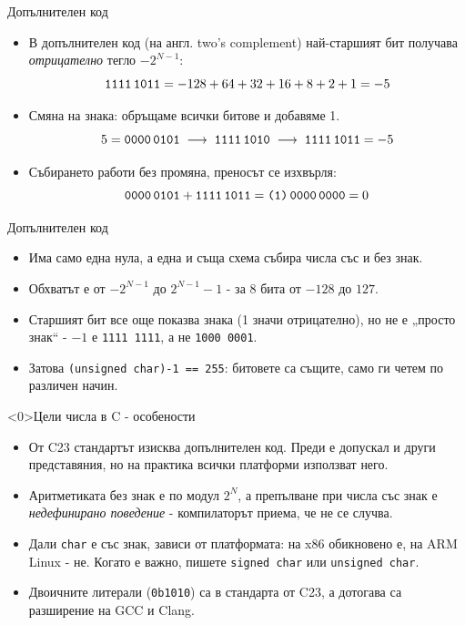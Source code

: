 \documentclass[14pt, aspectratio=169]{beamer}
\begin{document}
\begin{frame}{Допълнителен код}
  \begin{itemize}
    \item В допълнителен код (на англ. two's complement) най-старшият бит
      получава \emph{отрицателно} тегло $-2^{N-1}$:
      \[
        \texttt{1111\,1011} = -128 + 64 + 32 + 16 + 8 + 2 + 1 = -5
      \]
    \item Смяна на знака: обръщаме всички битове и добавяме 1.
      \[
        5 = \texttt{0000\,0101} \;\longrightarrow\; \texttt{1111\,1010}
        \;\longrightarrow\; \texttt{1111\,1011} = -5
      \]
    \item Събирането работи без промяна, преносът се изхвърля:
      \[
        \texttt{0000\,0101} + \texttt{1111\,1011} = \texttt{(1)\,0000\,0000} = 0
      \]
  \end{itemize}
\end{frame}

\begin{frame}{Допълнителен код}
  \begin{itemize}
    \item Има само една нула, а една и съща схема събира числа със и без знак.
    \item Обхватът е от $-2^{N-1}$ до $2^{N-1} - 1$ - за 8 бита от $-128$ до
      $127$.
    \item Старшият бит все още показва знака (1 значи отрицателно), но не е
      „просто знак“ - $-1$ е \texttt{1111\,1111}, а не \texttt{1000\,0001}.
    \item Затова \texttt{(unsigned char)-1 == 255}: битовете са същите, само
      ги четем по различен начин.
  \end{itemize}
\end{frame}

\begin{frame}<0>{Цели числа в C - особености}
  \begin{itemize}
    \item От C23 стандартът изисква допълнителен код. Преди е допускал и други
      представяния, но на практика всички платформи използват него.
    \item Аритметиката без знак е по модул $2^N$, а препълване при числа със
      знак е \emph{недефинирано поведение} - компилаторът приема, че не се
      случва.
    \item Дали \texttt{char} е със знак, зависи от платформата: на x86
      обикновено е, на ARM Linux - не. Когато е важно, пишете \texttt{signed
        char} или \texttt{unsigned char}.
    \item Двоичните литерали (\texttt{0b1010}) са в стандарта от C23, а дотогава
      са разширение на GCC и Clang.
  \end{itemize}
\end{frame}
\end{document}
